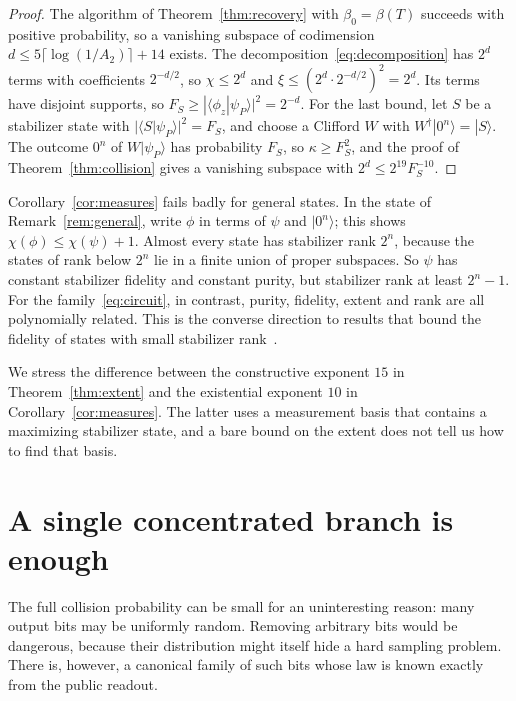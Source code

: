 \documentclass[a4paper,onecolumn,11pt,unpublished]{quantumarticle}
\theoremstyle{plain}
\theoremstyle{remark}
\newcommand{\ket}[1]{|#1\rangle}
\newcommand{\braket}[2]{\langle #1|#2\rangle}
\begin{document}
\begin{proof}
The algorithm of Theorem~\ref{thm:recovery} with $\beta_0=\beta(T)$ succeeds with positive probability, so a vanishing subspace of codimension $d\le5\lceil\log(1/A_2)\rceil+14$ exists. The decomposition~\eqref{eq:decomposition} has $2^d$ terms with coefficients $2^{-d/2}$, so $\chi\le2^d$ and $\xi\le(2^d\cdot2^{-d/2})^2=2^d$. Its terms have disjoint supports, so $F_S\ge|\braket{\phi_z}{\psi_P}|^2=2^{-d}$. For the last bound, let $S$ be a stabilizer state with $|\braket{S}{\psi_P}|^2=F_S$, and choose a Clifford $W$ with $W^\dagger\ket{0^n}=\ket{S}$. The outcome $0^n$ of $W\ket{\psi_P}$ has probability $F_S$, so $\kappa\ge F_S^2$, and the proof of Theorem~\ref{thm:collision} gives a vanishing subspace with $2^d\le2^{19}F_S^{-10}$.
\end{proof}

Corollary~\ref{cor:measures} fails badly for general states. In the state of Remark~\ref{rem:general}, write $\phi$ in terms of $\psi$ and $\ket{0^n}$; this shows $\chi(\phi)\le\chi(\psi)+1$. Almost every state has stabilizer rank $2^n$, because the states of rank below $2^n$ lie in a finite union of proper subspaces. So $\psi$ has constant stabilizer fidelity and constant purity, but stabilizer rank at least $2^n-1$. For the family~\eqref{eq:circuit}, in contrast, purity, fidelity, extent and rank are all polynomially related. This is the converse direction to results that bound the fidelity of states with small stabilizer rank~\cite{MT24}.

We stress the difference between the constructive exponent $15$ in Theorem~\ref{thm:extent} and the existential exponent $10$ in Corollary~\ref{cor:measures}. The latter uses a measurement basis that contains a maximizing stabilizer state, and a bare bound on the extent does not tell us how to find that basis.

\section{A single concentrated branch is enough}\label{sec:flag}

The full collision probability can be small for an uninteresting reason: many output bits may be uniformly random. Removing arbitrary bits would be dangerous, because their distribution might itself hide a hard sampling problem. There is, however, a canonical family of such bits whose law is known exactly from the public readout.
\end{document}
